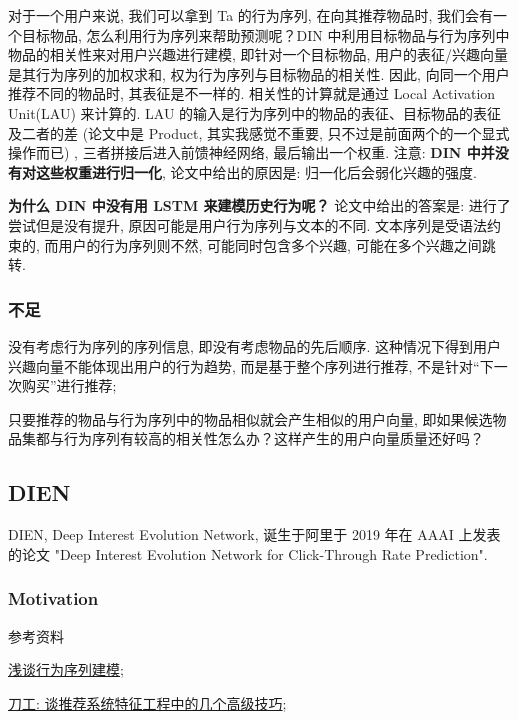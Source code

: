 对于一个用户来说, 我们可以拿到 Ta 的行为序列, 在向其推荐物品时, 我们会有一个目标物品, 怎么利用行为序列来帮助预测呢？DIN 中利用目标物品与行为序列中物品的相关性来对用户兴趣进行建模, 即针对一个目标物品, 用户的表征/兴趣向量是其行为序列的加权求和, 权为行为序列与目标物品的相关性. 因此, 向同一个用户推荐不同的物品时, 其表征是不一样的. 相关性的计算就是通过 Local Activation Unit(LAU) 来计算的. LAU 的输入是行为序列中的物品的表征、目标物品的表征及二者的差 (论文中是 Product, 其实我感觉不重要, 只不过是前面两个的一个显式操作而已) , 三者拼接后进入前馈神经网络, 最后输出一个权重. 注意: \textbf{DIN 中并没有对这些权重进行归一化}, 论文中给出的原因是: 归一化后会弱化兴趣的强度. 

\textbf{为什么 DIN 中没有用 LSTM 来建模历史行为呢？} 论文中给出的答案是: 进行了尝试但是没有提升, 原因可能是用户行为序列与文本的不同. 文本序列是受语法约束的, 而用户的行为序列则不然, 可能同时包含多个兴趣, 可能在多个兴趣之间跳转. 

\subsubsection{不足}
\begin{myitemize}
	\item 没有考虑行为序列的序列信息, 即没有考虑物品的先后顺序. 这种情况下得到用户兴趣向量不能体现出用户的行为趋势, 而是基于整个序列进行推荐, 不是针对“下一次购买”进行推荐; 
	
	\item 只要推荐的物品与行为序列中的物品相似就会产生相似的用户向量, 即如果候选物品集都与行为序列有较高的相关性怎么办？这样产生的用户向量质量还好吗？
\end{myitemize}

\subsection{DIEN}
DIEN, Deep Interest Evolution Network, 诞生于阿里于 2019 年在 AAAI 上发表的论文 "Deep Interest Evolution Network for Click-Through Rate Prediction". 

\subsubsection{Motivation}


参考资料
\begin{myitemize}
	\item \href{https://mp.weixin.qq.com/s?__biz=MzU0MDA1MzI0Mw==&mid=2247488129&idx=1&sn=ed882611a06b75e8e819b519010e9e81&chksm=fb3e4915cc49c003cb4505d0b09f06fa1c4e92409270b49f5509f1902774234382ba05b400d8&scene=21#wechat_redirect}{浅谈行为序列建模};
	
	\item \href{https://mp.weixin.qq.com/s?__biz=MzI5NTU2ODQzMg==&mid=2247484150&idx=1&sn=3bdb017a542bc2e2b94404f46ec9eb4f&chksm=ec50d7a9db275ebfdc009e6be3ea6a0ee8209477dafc99bc8a6a212fa0456a14bf4453b826dd&scene=21#wechat_redirect}{刀工: 谈推荐系统特征工程中的几个高级技巧};
\end{myitemize}